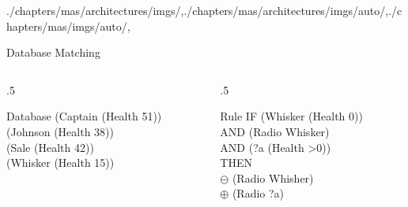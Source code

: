 \begin{graphicspathcontext}{{./chapters/mas/architectures/imgs/},{./chapters/mas/architectures/imgs/auto/},{./chapters/mas/imgs/auto/},\old}
\begin{frame}{Database Matching}
	\begin{columns}[t]
		\begin{column}{.5\linewidth}
			\begin{block}{Database}\ttfamily
				(Captain (Health 51)) \\
				(Johnson (Health 38)) \\
				(Sale (Health 42)) \\
				(Whisker (Health 15))
			\end{block}
		\end{column}
		\begin{column}{.5\linewidth}
			\begin{block}{Rule}\ttfamily
				IF (Whisker (Health 0)) \\
				AND (Radio Whisker) \\
				AND (?a (Health >0)) \\
				THEN \\
				$\ominus$ (Radio Whisher) \\
				$\oplus$ (Radio ?a)
			\end{block}
		\end{column}
	\end{columns}
	\vspace{.5cm}
\end{frame}


\end{graphicspathcontext}
